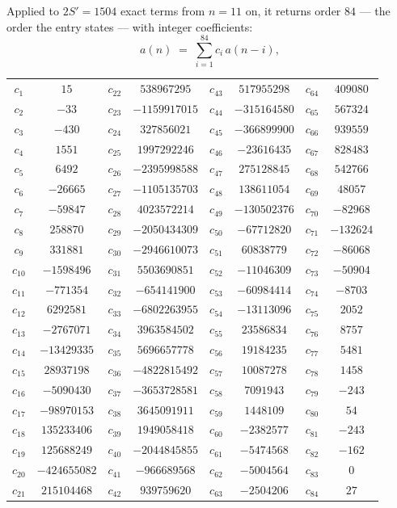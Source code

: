 \documentclass[11pt,a4paper]{article}
\theoremstyle{plain}
\theoremstyle{definition}
\begin{document}
Applied to $2S'=1504$ exact terms from $n=11$ on, it returns order $84$ --- the
order the entry states --- with integer coefficients:
\[
a(n)\;=\;\sum_{i=1}^{84}c_i\,a(n-i),
\]
\begin{center}\small
\begin{tabular}{cccccccc}
$c_{1}$ & $15$ & $c_{22}$ & $538967295$ & $c_{43}$ & $517955298$ & $c_{64}$ & $409080$ \\
$c_{2}$ & $-33$ & $c_{23}$ & $-1159917015$ & $c_{44}$ & $-315164580$ & $c_{65}$ & $567324$ \\
$c_{3}$ & $-430$ & $c_{24}$ & $327856021$ & $c_{45}$ & $-366899900$ & $c_{66}$ & $939559$ \\
$c_{4}$ & $1551$ & $c_{25}$ & $1997292246$ & $c_{46}$ & $-23616435$ & $c_{67}$ & $828483$ \\
$c_{5}$ & $6492$ & $c_{26}$ & $-2395998588$ & $c_{47}$ & $275128845$ & $c_{68}$ & $542766$ \\
$c_{6}$ & $-26665$ & $c_{27}$ & $-1105135703$ & $c_{48}$ & $138611054$ & $c_{69}$ & $48057$ \\
$c_{7}$ & $-59847$ & $c_{28}$ & $4023572214$ & $c_{49}$ & $-130502376$ & $c_{70}$ & $-82968$ \\
$c_{8}$ & $258870$ & $c_{29}$ & $-2050434309$ & $c_{50}$ & $-67712820$ & $c_{71}$ & $-132624$ \\
$c_{9}$ & $331881$ & $c_{30}$ & $-2946610073$ & $c_{51}$ & $60838779$ & $c_{72}$ & $-86068$ \\
$c_{10}$ & $-1598496$ & $c_{31}$ & $5503690851$ & $c_{52}$ & $-11046309$ & $c_{73}$ & $-50904$ \\
$c_{11}$ & $-771354$ & $c_{32}$ & $-654141900$ & $c_{53}$ & $-60984414$ & $c_{74}$ & $-8703$ \\
$c_{12}$ & $6292581$ & $c_{33}$ & $-6802263955$ & $c_{54}$ & $-13113096$ & $c_{75}$ & $2052$ \\
$c_{13}$ & $-2767071$ & $c_{34}$ & $3963584502$ & $c_{55}$ & $23586834$ & $c_{76}$ & $8757$ \\
$c_{14}$ & $-13429335$ & $c_{35}$ & $5696657778$ & $c_{56}$ & $19184235$ & $c_{77}$ & $5481$ \\
$c_{15}$ & $28937198$ & $c_{36}$ & $-4822815492$ & $c_{57}$ & $10087278$ & $c_{78}$ & $1458$ \\
$c_{16}$ & $-5090430$ & $c_{37}$ & $-3653728581$ & $c_{58}$ & $7091943$ & $c_{79}$ & $-243$ \\
$c_{17}$ & $-98970153$ & $c_{38}$ & $3645091911$ & $c_{59}$ & $1448109$ & $c_{80}$ & $54$ \\
$c_{18}$ & $135233406$ & $c_{39}$ & $1949058418$ & $c_{60}$ & $-2382577$ & $c_{81}$ & $-243$ \\
$c_{19}$ & $125688249$ & $c_{40}$ & $-2044845855$ & $c_{61}$ & $-5474568$ & $c_{82}$ & $-162$ \\
$c_{20}$ & $-424655082$ & $c_{41}$ & $-966689568$ & $c_{62}$ & $-5004564$ & $c_{83}$ & $0$ \\
$c_{21}$ & $215104468$ & $c_{42}$ & $939759620$ & $c_{63}$ & $-2504206$ & $c_{84}$ & $27$ \\
\end{tabular}
\end{center}
\end{document}
